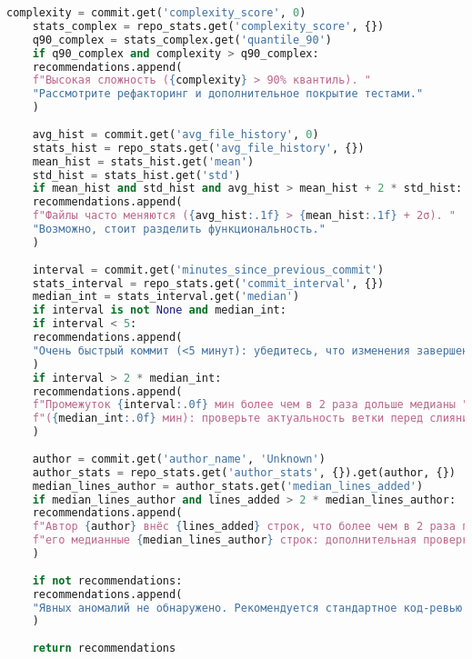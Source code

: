 \begin{lstlisting}[language=Python, caption={{ \texttt{recommendationds.py}}}]
	complexity = commit.get('complexity_score', 0)
	stats_complex = repo_stats.get('complexity_score', {})
	q90_complex = stats_complex.get('quantile_90')
	if q90_complex and complexity > q90_complex:
	recommendations.append(
	f"Высокая сложность ({complexity} > 90% квантиль). "
	"Рассмотрите рефакторинг и дополнительное покрытие тестами."
	)
	
	avg_hist = commit.get('avg_file_history', 0)
	stats_hist = repo_stats.get('avg_file_history', {})
	mean_hist = stats_hist.get('mean')
	std_hist = stats_hist.get('std')
	if mean_hist and std_hist and avg_hist > mean_hist + 2 * std_hist:
	recommendations.append(
	f"Файлы часто меняются ({avg_hist:.1f} > {mean_hist:.1f} + 2σ). "
	"Возможно, стоит разделить функциональность."
	)
	
	interval = commit.get('minutes_since_previous_commit')
	stats_interval = repo_stats.get('commit_interval', {})
	median_int = stats_interval.get('median')
	if interval is not None and median_int:
	if interval < 5:
	recommendations.append(
	"Очень быстрый коммит (<5 минут): убедитесь, что изменения завершены и протестированы."
	)
	if interval > 2 * median_int:
	recommendations.append(
	f"Промежуток {interval:.0f} мин более чем в 2 раза дольше медианы "
	f"({median_int:.0f} мин): проверьте актуальность ветки перед слиянием."
	)
	
	author = commit.get('author_name', 'Unknown')
	author_stats = repo_stats.get('author_stats', {}).get(author, {})
	median_lines_author = author_stats.get('median_lines_added')
	if median_lines_author and lines_added > 2 * median_lines_author:
	recommendations.append(
	f"Автор {author} внёс {lines_added} строк, что более чем в 2 раза превышает "
	f"его медианные {median_lines_author} строк: дополнительная проверка кода."
	)
	
	if not recommendations:
	recommendations.append(
	"Явных аномалий не обнаружено. Рекомендуется стандартное код-ревью и покрытие тестами."
	)
	
	return recommendations
\end{lstlisting}